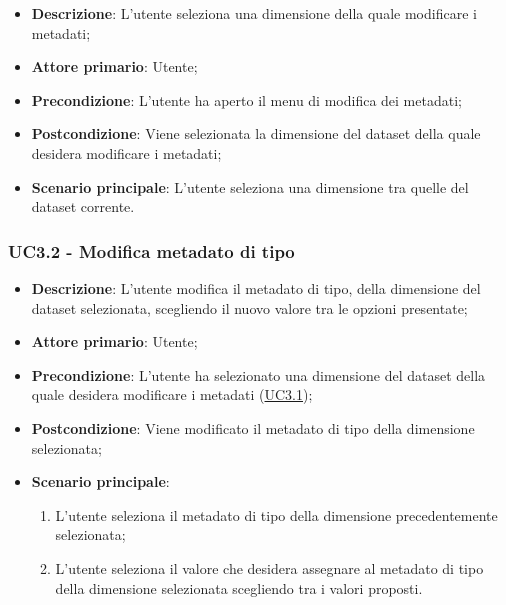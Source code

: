\begin{itemize}
    \item \textbf{Descrizione}: L’utente seleziona una dimensione della quale modificare i metadati;
    \item \textbf{Attore primario}: Utente;

    \item \textbf{Precondizione}:   L'utente ha aperto il menu di modifica dei metadati;
    \item \textbf{Postcondizione}:  Viene selezionata la dimensione del dataset della quale desidera modificare i 
    metadati;

	\item \textbf{Scenario principale}: L'utente seleziona una dimensione tra quelle del dataset corrente.
\end{itemize}

\subsubsection{UC3.2 - Modifica metadato di tipo}
\label{ssub:uc3.2}

\begin{itemize}
    \item \textbf{Descrizione}: L’utente modifica il metadato di tipo, della dimensione del dataset selezionata, 
    scegliendo il nuovo valore tra le opzioni presentate;
	
    \item \textbf{Attore primario}: Utente;
    
    \item \textbf{Precondizione}:   L'utente ha selezionato una dimensione del dataset della quale desidera modificare 
    i metadati (\hyperref[ssub:uc3.1]{UC3.1});
    \item \textbf{Postcondizione}:  Viene modificato il metadato di tipo della dimensione selezionata;

	\item \textbf{Scenario principale}:
	\begin{enumerate}
        \item L'utente seleziona il metadato di tipo della dimensione precedentemente selezionata;
        \item L'utente seleziona il valore che desidera assegnare al metadato di tipo della dimensione selezionata 
        scegliendo tra i valori proposti.
    \end{enumerate}
    
   
\end{itemize}



